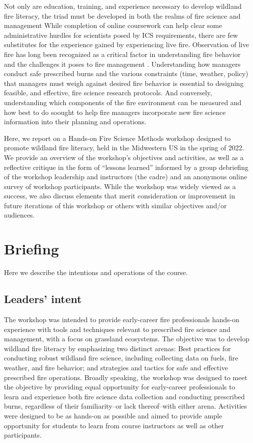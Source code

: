 \documentclass[fire,article,submit,moreauthors,pdftex]{Definitions/mdpi}
\begin{document}
Not only are education, training, and experience necessary to develop wildland fire literacy, the triad must be developed in both the realms of fire science and management 
While completion of online coursework can help clear some administrative hurdles for scientists posed by ICS requirements, there are few substitutes for the experience gained by experiencing live fire.
Observation of live fire has long been recognized as a critical factor in understanding fire behavior and the challenges it poses to fire management \citep{alexander1990, andrews1989}.
Understanding how managers conduct safe prescribed burns and the various constraints (time, weather, policy) that managers must weigh against desired fire behavior is essential to designing feasible, and effective, fire science research protocols.
And conversely, understanding which components of the fire environment can be measured \textemdash and how best to do so\textemdash ought to help fire managers incorporate new fire science information into their planning and operations.

Here, we report on a Hands-on Fire Science Methods workshop designed to promote wildland fire literacy, held in the Midwestern US in the spring of 2022.
We provide an overview of the workshop's objectives and activities, as well as a reflective critique in the form of ``lessons learned'' informed by a group debriefing of the workshop leadership and instructors (the cadre) and an anonymous online survey of workshop participants.
While the workshop was widely viewed as a success, we also discuss elements that merit consideration or improvement in future iterations of this workshop or others with similar objectives and/or audiences.

\section{Briefing} 

Here we describe the intentions and operations of the course.

\subsection{Leaders' intent}

The workshop was intended to provide early-career fire professionals hands-on experience with tools and techniques relevant to prescribed fire science and management, with a focus on grassland ecosystems.
The objective was to develop wildland fire literacy by emphasizing two distinct arenas: Best practices for conducting robust wildland fire science, including collecting data on fuels, fire weather, and fire behavior; and strategies and tactics for safe and effective prescribed fire operations.
Broadly speaking, the workshop was designed to meet the objective by providing equal opportunity for early-career professionals to learn and experience both fire science data collection and conducting prescribed burns, regardless of their familiarity--or lack thereof--with either arena.
Activities were designed to be as hands-on as possible and aimed to provide ample opportunity for students to learn from course instructors as well as other participants.
\end{document}
